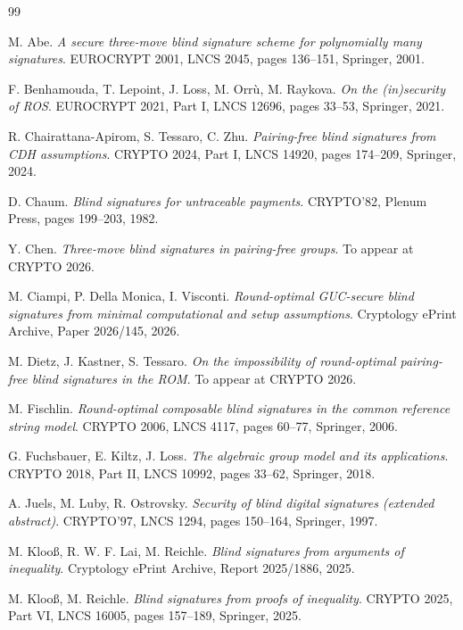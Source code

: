 \documentclass{conjura-conjecture}
\begin{document}
\begin{conjurabibliography}{99}

M. Abe.
\emph{A secure three-move blind signature scheme for polynomially many
signatures}.
EUROCRYPT 2001, LNCS 2045, pages 136--151, Springer, 2001.

F. Benhamouda, T. Lepoint, J. Loss, M. Orr\`u, M. Raykova.
\emph{On the (in)security of ROS}.
EUROCRYPT 2021, Part I, LNCS 12696, pages 33--53, Springer, 2021.

R. Chairattana-Apirom, S. Tessaro, C. Zhu.
\emph{Pairing-free blind signatures from CDH assumptions}.
CRYPTO 2024, Part I, LNCS 14920, pages 174--209, Springer, 2024.

D. Chaum.
\emph{Blind signatures for untraceable payments}.
CRYPTO'82, Plenum Press, pages 199--203, 1982.

Y. Chen.
\emph{Three-move blind signatures in pairing-free groups}.
To appear at CRYPTO 2026.

M. Ciampi, P. Della Monica, I. Visconti.
\emph{Round-optimal GUC-secure blind signatures from minimal computational
and setup assumptions}.
Cryptology ePrint Archive, Paper 2026/145, 2026.

M. Dietz, J. Kastner, S. Tessaro.
\emph{On the impossibility of round-optimal pairing-free blind signatures
in the ROM}.
To appear at CRYPTO 2026.

M. Fischlin.
\emph{Round-optimal composable blind signatures in the common reference
string model}.
CRYPTO 2006, LNCS 4117, pages 60--77, Springer, 2006.

G. Fuchsbauer, E. Kiltz, J. Loss.
\emph{The algebraic group model and its applications}.
CRYPTO 2018, Part II, LNCS 10992, pages 33--62, Springer, 2018.

A. Juels, M. Luby, R. Ostrovsky.
\emph{Security of blind digital signatures (extended abstract)}.
CRYPTO'97, LNCS 1294, pages 150--164, Springer, 1997.

M. Kloo\ss{}, R. W. F. Lai, M. Reichle.
\emph{Blind signatures from arguments of inequality}.
Cryptology ePrint Archive, Report 2025/1886, 2025.

M. Kloo\ss{}, M. Reichle.
\emph{Blind signatures from proofs of inequality}.
CRYPTO 2025, Part VI, LNCS 16005, pages 157--189, Springer, 2025.


\end{conjurabibliography}
\end{document}
